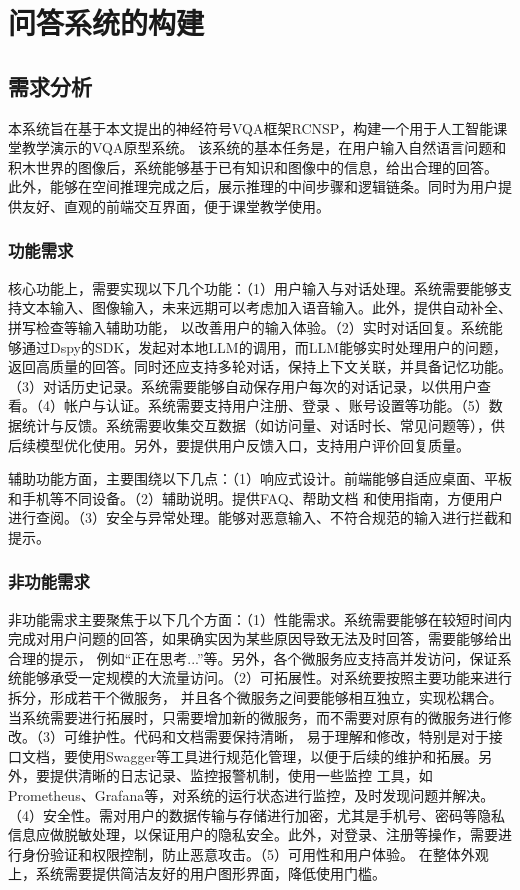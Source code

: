 \chapter{问答系统的构建}
\section{需求分析}
本系统旨在基于本文提出的神经符号VQA框架RCNSP，构建一个用于人工智能课堂教学演示的VQA原型系统。
该系统的基本任务是，在用户输入自然语言问题和积木世界的图像后，系统能够基于已有知识和图像中的信息，给出合理的回答。
此外，能够在空间推理完成之后，展示推理的中间步骤和逻辑链条。同时为用户提供友好、直观的前端交互界面，便于课堂教学使用。

\subsection{功能需求}
核心功能上，需要实现以下几个功能：（1）用户输入与对话处理。系统需要能够支持文本输入、图像输入，未来远期可以考虑加入语音输入。此外，提供自动补全、拼写检查等输入辅助功能，
以改善用户的输入体验。（2）实时对话回复。系统能够通过Dspy的SDK，发起对本地LLM的调用，而LLM能够实时处理用户的问题，返回高质量的回答。同时还应支持多轮对话，保持上下文关联，并具备记忆功能。（3）对话历史记录。系统需要能够自动保存用户每次的对话记录，以供用户查看。（4）帐户与认证。系统需要支持用户注册、登录
、账号设置等功能。（5）数据统计与反馈。系统需要收集交互数据（如访问量、对话时长、常见问题等），供后续模型优化使用。另外，要提供用户反馈入口，支持用户评价回复质量。

辅助功能方面，主要围绕以下几点：（1）响应式设计。前端能够自适应桌面、平板和手机等不同设备。（2）辅助说明。提供FAQ、帮助文档
和使用指南，方便用户进行查阅。（3）安全与异常处理。能够对恶意输入、不符合规范的输入进行拦截和提示。
\subsection{非功能需求}
非功能需求主要聚焦于以下几个方面：（1）性能需求。系统需要能够在较短时间内完成对用户问题的回答，如果确实因为某些原因导致无法及时回答，需要能够给出合理的提示，
例如“正在思考...”等。另外，各个微服务应支持高并发访问，保证系统能够承受一定规模的大流量访问。（2）可拓展性。对系统要按照主要功能来进行拆分，形成若干个微服务，
并且各个微服务之间要能够相互独立，实现松耦合。当系统需要进行拓展时，只需要增加新的微服务，而不需要对原有的微服务进行修改。（3）可维护性。代码和文档需要保持清晰，
易于理解和修改，特别是对于接口文档，要使用Swagger等工具进行规范化管理，以便于后续的维护和拓展。另外，要提供清晰的日志记录、监控报警机制，使用一些监控
工具，如Prometheus、Grafana等，对系统的运行状态进行监控，及时发现问题并解决。（4）安全性。需对用户的数据传输与存储进行加密，尤其是手机号、密码等隐私信息应做脱敏处理，以保证用户的隐私安全。此外，对登录、注册等操作，需要进行身份验证和权限控制，防止恶意攻击。（5）可用性和用户体验。
在整体外观上，系统需要提供简洁友好的用户图形界面，降低使用门槛。

